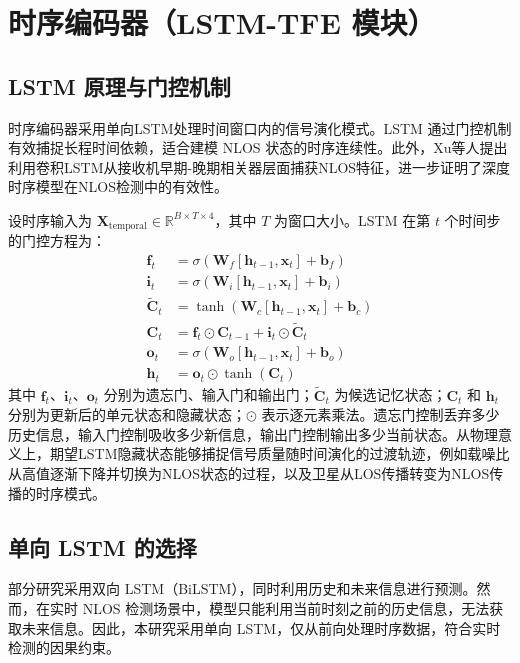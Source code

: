 \section{时序编码器（LSTM-TFE 模块）}

\subsection{LSTM 原理与门控机制}

    时序编码器采用单向LSTM处理时间窗口内的信号演化模式。LSTM 通过门控机制有效捕捉长程时间依赖，适合建模 NLOS 状态的时序连续性。此外，Xu等人\cite{xu2025conv_lstm}提出利用卷积LSTM从接收机早期-晚期相关器层面捕获NLOS特征，进一步证明了深度时序模型在NLOS检测中的有效性。

    设时序输入为 $\bm{X}_{\text{temporal}} \in \mathbb{R}^{B \times T \times 4}$，其中 $T$ 为窗口大小。LSTM 在第 $t$ 个时间步的门控方程为：
    \begin{align}
    \bm{f}_t &= \sigma(\bm{W}_f [\bm{h}_{t-1}, \bm{x}_t] + \bm{b}_f) \\
    \bm{i}_t &= \sigma(\bm{W}_i [\bm{h}_{t-1}, \bm{x}_t] + \bm{b}_i) \\
    \tilde{\bm{C}}_t &= \tanh(\bm{W}_c [\bm{h}_{t-1}, \bm{x}_t] + \bm{b}_c) \\
    \bm{C}_t &= \bm{f}_t \odot \bm{C}_{t-1} + \bm{i}_t \odot \tilde{\bm{C}}_t \\
    \bm{o}_t &= \sigma(\bm{W}_o [\bm{h}_{t-1}, \bm{x}_t] + \bm{b}_o) \\
    \bm{h}_t &= \bm{o}_t \odot \tanh(\bm{C}_t)
    \end{align}
    其中 $\bm{f}_t$、$\bm{i}_t$、$\bm{o}_t$ 分别为遗忘门、输入门和输出门；$\tilde{\bm{C}}_t$ 为候选记忆状态；$\bm{C}_t$ 和 $\bm{h}_t$ 分别为更新后的单元状态和隐藏状态；$\odot$ 表示逐元素乘法。遗忘门控制丢弃多少历史信息，输入门控制吸收多少新信息，输出门控制输出多少当前状态。从物理意义上，期望LSTM隐藏状态能够捕捉信号质量随时间演化的过渡轨迹，例如载噪比从高值逐渐下降并切换为NLOS状态的过程，以及卫星从LOS传播转变为NLOS传播的时序模式。

\subsection{单向 LSTM 的选择}

    部分研究采用双向 LSTM（BiLSTM），同时利用历史和未来信息进行预测。然而，在实时 NLOS 检测场景中，模型只能利用当前时刻之前的历史信息，无法获取未来信息。因此，本研究采用单向 LSTM，仅从前向处理时序数据，符合实时检测的因果约束。

